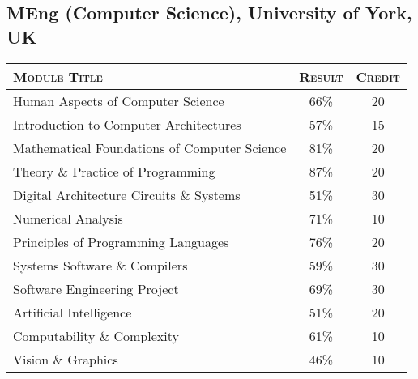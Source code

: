 \documentclass[a4paper,10pt]{article}
\newcommand{\detail}[2]{\hypertarget{details:#1}{\subsection{#2}}}
\begin{document}
\detail{csyork}{MEng (Computer Science), University of York, UK}
\begin{tabular}{p{11cm}|c|c}
  \hline
  \textsc{Module Title}                        & \textsc{Result} & \textsc{Credit}\\
  \hline

  Human Aspects of Computer Science            & 66\%            & 20\\
  Introduction to Computer Architectures       & 57\%            & 15\\
  Mathematical Foundations of Computer Science & 81\%            & 20\\
  Theory \& Practice of Programming            & 87\%            & 20\\
  Digital Architecture Circuits \& Systems     & 51\%            & 30\\
  Numerical Analysis                           & 71\%            & 10\\
  Principles of Programming Languages          & 76\%            & 20\\
  Systems Software \& Compilers                & 59\%            & 30\\
  Software Engineering Project                 & 69\%            & 30\\
  Artificial Intelligence                      & 51\%            & 20\\
  Computability \& Complexity                  & 61\%            & 10\\
  Vision \& Graphics                           & 46\%            & 10\\
\end{tabular}
\end{document}
